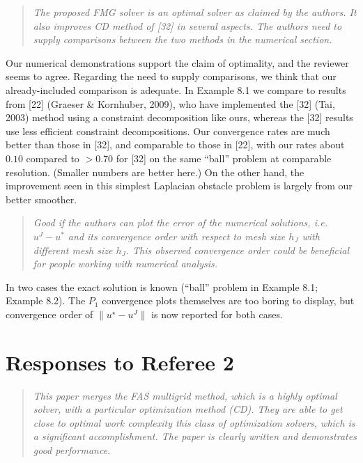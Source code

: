 \documentclass[letterpaper,final,12pt,reqno]{amsart}
\newenvironment{review}%
{\bigskip \par \begin{quote} \selectfont \sl}%
{\end{quote}}
\newcommand\short[1]{\medskip\noindent #1}   %
\begin{document}
\begin{review}
The proposed FMG solver is an optimal solver as claimed by the authors. It also improves CD method of [32] in several aspects. The authors need to supply comparisons between the two methods in the numerical section.
\end{review}

\short{Our numerical demonstrations support the claim of optimality, and the reviewer seems to agree.  Regarding the need to supply comparisons, we think that our already-included comparison is adequate.  In Example 8.1 we compare to results from [22] (Graeser \& Kornhuber, 2009), who have  implemented the [32] (Tai, 2003) method using a constraint decomposition like ours, whereas the [32] results use less efficient constraint decompositions.  Our convergence rates are much better than those in [32], and comparable to those in [22], with our rates about $0.10$ compared to $>0.70$ for [32] on the same ``ball'' problem at comparable resolution.  (Smaller numbers are better here.)  On the other hand, the improvement seen in this simplest Laplacian obstacle problem is largely from our better smoother.}

\begin{review}
Good if the authors can plot the error of the numerical solutions, i.e. $u^J - u^*$ and its convergence order with respect to mesh size $h_J$ with different mesh size $h_J$. This observed convergence order could be beneficial for people working with numerical analysis.
\end{review}

\short{In two cases the exact solution is known (``ball'' problem in Example 8.1; Example 8.2).  The $P_1$ convergence plots themselves are too boring to display, but convergence order of $\|u^\star - u^J\|$ is now reported for both cases.}


\section{Responses to Referee 2}

\begin{review}
This paper merges the FAS multigrid method, which is a highly optimal solver, with a particular optimization method (CD).  They are able to get close to optimal work complexity this class of optimization solvers, which is a significant accomplishment.  The paper is clearly written and demonstrates good performance.
\end{review}
\end{document}
